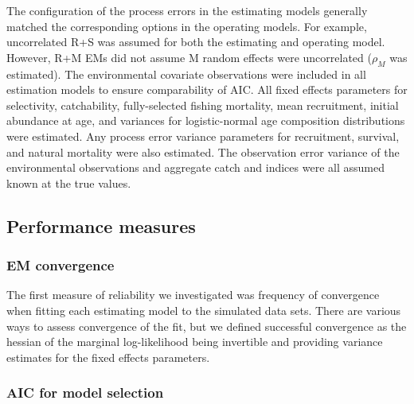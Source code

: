 \documentclass[
  12pt,
]{article}
\begin{document}
The configuration of the process errors in the estimating models generally matched the corresponding options in the operating models. For example, uncorrelated R+S was assumed for both the estimating and operating model. However, R+M EMs did not assume M random effects were uncorrelated (\(\rho_M\) was estimated). The environmental covariate observations were included in all estimation models to ensure comparability of AIC. All fixed effects parameters for selectivity, catchability, fully-selected fishing mortality, mean recruitment, initial abundance at age, and variances for logistic-normal age composition distributions were estimated. Any process error variance parameters for recruitment, survival, and natural mortality were also estimated. The observation error variance of the environmental observations and aggregate catch and indices were all assumed known at the true values.

\hypertarget{performance-measures}{%
\subsection*{Performance measures}\label{performance-measures}}

\hypertarget{em-convergence}{%
\subsubsection*{EM convergence}\label{em-convergence}}

The first measure of reliability we investigated was frequency of convergence when fitting each estimating model to the simulated data sets. There are various ways to assess convergence of the fit, but we defined successful convergence as the hessian of the marginal log-likelihood being invertible and providing variance estimates for the fixed effects parameters.

\hypertarget{aic-for-model-selection}{%
\subsubsection*{AIC for model selection}\label{aic-for-model-selection}}
\end{document}
